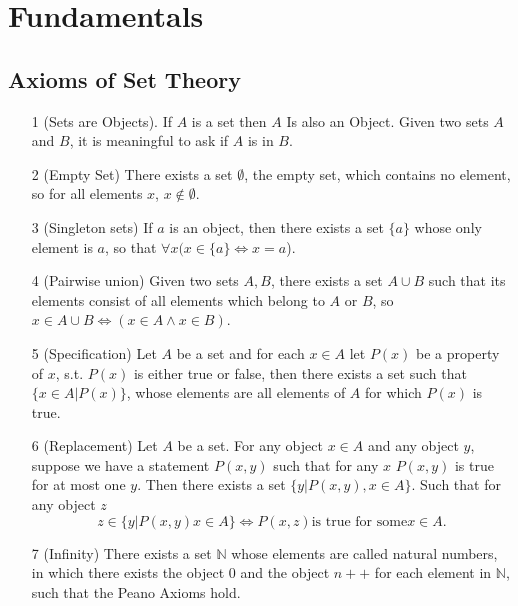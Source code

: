 \documentclass[]{scrbook}
\begin{document}
\section{Fundamentals}
\subsection{Axioms of Set Theory}
\begin{itemize}
	\item[1] (Sets are Objects). If $A$ is a set then $A$ Is also an Object. Given two sets $A$ and $B$, it is meaningful to ask if $A$ is in $B$.
	\item[2] (Empty Set) There exists a set $\emptyset$, the empty set, which contains no element, so for all elements $x$, $x\notin\emptyset$.
	\item[3] (Singleton sets) If $a$ is an object, then there exists a set $\{a\}$ whose only element is $a$, so that $\forall x(x \in \{a\} \Leftrightarrow x = a$).
	\item[4] (Pairwise union) Given two sets $A, B$, there exists a set $A\cup B$ such that its elements consist of all elements which belong to $A$ or $B$, so $x \in A\cup B \Leftrightarrow (x\in A\wedge x\in B)$.
	\item[5] (Specification) Let $A$ be a set and for each $x\in A$ let $P(x)$ be a property of $x$, s.t. $P(x)$ is either true or false, then there exists a set such that $\{x\in A | P(x)\}$, whose elements are all elements of $A$ for which $P(x)$ is true.
	\item[6] (Replacement) Let $A$ be a set. For any object $x\in A$ and any object $y$, suppose we have a statement $P(x,y)$ such that for any $x$ $P(x,y)$ is true for at most one $y$. Then there exists a set $\{y| P(x,y) , x\in A\}$. Such that for any object $z$
	\begin{equation*}
		z\in\{y | P(x,y) x\in A\} \Leftrightarrow P(x,z) \text{is true for some} x\in A.
	\end{equation*}
	\item[7] (Infinity) There exists a set $\mathbb{N}$ whose elements are called natural numbers, in which there exists the object $0$ and the object $n++$ for each element in $\mathbb{N}$, such that the Peano Axioms hold.
	
\end{itemize}
\end{document}
